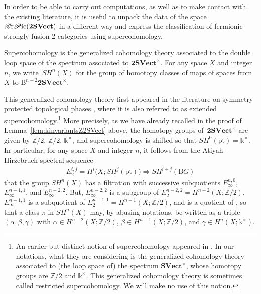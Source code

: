 \documentclass[pdftex]{sigma}
\numberwithin{equation}{section}
\begin{document}
In order to be able to carry out computations, as well as to make contact with the existing literature, it is useful to unpack the data of the space $\mathscr{B}{\rm r}\mathscr{P}{\rm ic}(\mathbf{2SVect})$ in a different way and express the classification of fermionic strongly fusion 2-categories using supercohomology.

\begin{Definition}
Supercohomology is the generalized cohomology theory associated to the double loop space of the spectrum associated to $\mathbf{2SVect}^{\times}$. For any space $X$ and integer $n$, we write~$SH^n(X)$ for the group of homotopy classes of maps of spaces from $X$ to $\mathrm{B}^{n-2}\mathbf{2SVect}^{\times}$.
\end{Definition}

This generalized cohomology theory first appeared in the literature on symmetry protected topological phases \cite{GJF0, KT,WG}, where it is also referred to as extended supercohomology.\footnote{An earlier but distinct notion of supercohomology appeared in \cite{GW}. In our notations, what they are considering is the generalized cohomology theory associated to (the loop space of) the spectrum $\mathbf{SVect}^{\times}$, whose homotopy groups are $\mathbb{Z}/2$ and $\mathds{k}^{\times}$. This generalized cohomology theory is sometimes called restricted supercohomology. We will make no use of this notion.} More precisely, as we have already recalled in the proof of Lemma~\ref{lem:kinvariantsZ2SVect} above, the homotopy groups of~$\mathbf{2SVect}^{\times}$ are given by $\mathbb{Z}/2$, $\mathbb{Z}/2$, $\mathds{k}^{\times}$, and supercohomology is shifted so that $SH^0(\mathrm{pt})=\mathds{k}^{\times}$. In particular, for any space $X$ and integer $n$, it follows from the Atiyah--Hirzebruch spectral sequence
\begin{gather*}
E_2^{i,j}=H^i\big(X;SH^j(\mathrm{pt})\big)\Rightarrow SH^{i+j}(\mathrm{B}G)
\end{gather*}
 that the group $SH^n(X)$ has a filtration with successive subquotients $E^{n,0}_{\infty}$, $E^{n-1,1}_{\infty}$, and $E^{n-2,2}_{\infty}$. But, $E^{n-2,2}_{\infty}$ is a subgroup of $E^{n-2,2}_{2}=H^{n-2}(X;\mathbb{Z}/2)$, $E^{n-1,1}_{\infty}$ is a subquotient of $E^{n-1,1}_{2}=H^{n-1}(X;\mathbb{Z}/2)$, and  is a quotient of , so that a class $\pi$ in $SH^n(X)$ may, by abusing notations, be written as a triple $(\alpha,\beta,\gamma)$ with $\alpha\in H^{n-2}(X;\mathbb{Z}/2)$, $\beta\in H^{n-1}(X;\mathbb{Z}/2)$, and $\gamma\in H^n(X;\mathds{k}^{\times})$.
\end{document}
